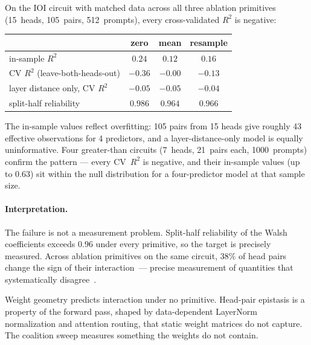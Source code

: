 On the IOI circuit with matched data across all three ablation primitives
(15~heads, 105~pairs, 512~prompts), every cross-validated $R^2$ is negative:

\medskip

\begin{tabular}{lccc}
\toprule
 & zero & mean & resample \\
\midrule
in-sample $R^2$ & $0.24$ & $0.12$ & $0.16$ \\
CV $R^2$ (leave-both-heads-out) & $-0.36$ & $-0.00$ & $-0.13$ \\
layer distance only, CV $R^2$ & $-0.05$ & $-0.05$ & $-0.04$ \\
split-half reliability & $0.986$ & $0.964$ & $0.966$ \\
\bottomrule
\end{tabular}

\medskip

\noindent The in-sample values reflect overfitting: 105 pairs from 15 heads
give roughly 43 effective observations for 4 predictors, and a
layer-distance-only model is equally uninformative. Four greater-than circuits
(7~heads, 21~pairs each, 1000~prompts) confirm the pattern --- every CV~$R^2$
is negative, and their in-sample values (up to $0.63$) sit within the null
distribution for a four-predictor model at that sample size.

\paragraph{Interpretation.}

The failure is not a measurement problem. Split-half reliability of the Walsh
coefficients exceeds $0.96$ under every primitive, so the target is precisely
measured. Across ablation primitives on the same circuit, $38\%$ of head pairs
change the sign of their interaction~--- precise measurement of quantities
that systematically disagree~\citep{housden2017comparison}.

Weight geometry predicts interaction under no primitive. Head-pair epistasis is
a property of the forward pass, shaped by data-dependent LayerNorm
normalization and attention routing, that static weight matrices do not
capture. The coalition sweep measures something the weights do not contain.
